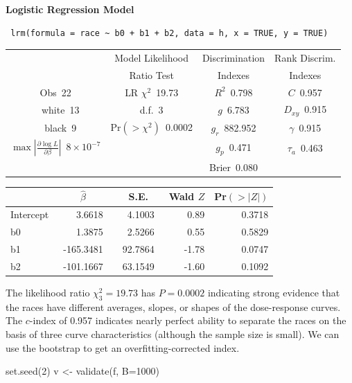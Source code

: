  \noindent \textbf{Logistic Regression Model}
 
 \begin{verbatim}
 lrm(formula = race ~ b0 + b1 + b2, data = h, x = TRUE, y = TRUE)
 \end{verbatim}
 
 {\selectfont \begin{center}\begin{tabular}{|c|c|c|c|}\hline
&Model Likelihood&Discrimination&Rank Discrim.\\
&Ratio Test&Indexes&Indexes\\\hline
Obs~\hfill 22&LR $\chi^{2}$~\hfill 19.73&$R^{2}$~\hfill 0.798&$C$~\hfill 0.957\\
~~white~\hfill 13&d.f.~\hfill 3&$g$~\hfill 6.783&$D_{xy}$~\hfill 0.915\\
~~black~\hfill 9&Pr$(>\chi^{2})$~\hfill 0.0002&$g_{r}$~\hfill 882.952&$\gamma$~\hfill 0.915\\
$\max|\frac{\partial\log L}{\partial \beta}|$~\hfill $8\!\times\!10^{-7}$&&$g_{p}$~\hfill 0.471&$\tau_{a}$~\hfill 0.463\\
&&Brier~\hfill 0.080&\\
\hline
\end{tabular}
\end{center}}
 
 \setlongtables\begin{longtable}{lrrrr}\hline
 \multicolumn{1}{l}{}&\multicolumn{1}{c}{$\hat{\beta}$}&\multicolumn{1}{c}{S.E.}&\multicolumn{1}{c}{Wald $Z$}&\multicolumn{1}{c}{Pr$(>|Z|)$}\tabularnewline
 \hline
 \endhead
 \hline
 \endfoot
 Intercept&~   3.6618~&~ 4.1003~& 0.89&0.3718\tabularnewline
 b0&~   1.3875~&~ 2.5266~& 0.55&0.5829\tabularnewline
 b1&~-165.3481~&~92.7864~&-1.78&0.0747\tabularnewline
 b2&~-101.1667~&~63.1549~&-1.60&0.1092\tabularnewline
 \hline
 \end{longtable}
 \addtocounter{table}{-1}

The likelihood ratio $\chi^{2}_{3}=19.73$ has $P=0.0002$ \ipacue
indicating strong evidence that the races have different averages,
slopes, or shapes of the dose-response curves.  The $c$-index of 0.957
indicates nearly perfect ability to separate the races on the basis of three
curve characteristics (although the sample size is small).  We can use
the bootstrap to get an overfitting-corrected index.
\begin{Sinput}
set.seed(2)
v <- validate(f, B=1000)
\end{Sinput}

